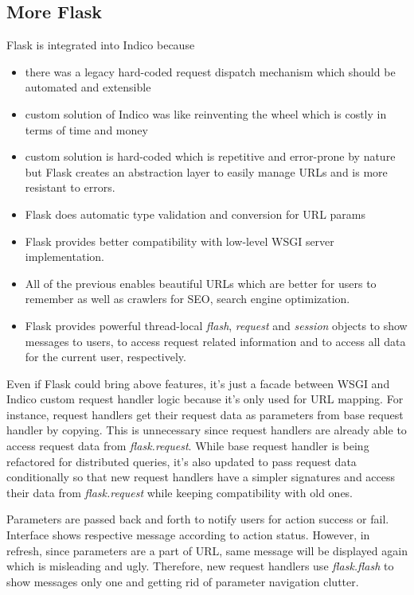 \subsection{More Flask}

Flask is integrated into Indico because
\begin{itemize}
  \item there was a legacy hard-coded request dispatch mechanism which should be automated and extensible
  \item custom solution of Indico was like reinventing the wheel which is costly in terms of time and money
  \item custom solution is hard-coded which is repetitive and error-prone by nature but Flask creates an abstraction layer to easily manage URLs and is more resistant to errors.
  \item Flask does automatic type validation and conversion for URL params
  \item Flask provides better compatibility with low-level WSGI server implementation.
  \item All of the previous enables beautiful URLs which are better for users to remember as well as crawlers for SEO, search engine optimization.
  \item Flask provides powerful thread-local \textit{flash}, \textit{request} and \textit{session} objects to show messages to users, to access request related information and to access all data for the current user, respectively. 
\end{itemize}

Even if Flask could bring above features, it's just a facade between WSGI and Indico custom request handler logic because it's only used for URL mapping. For instance, request handlers get their request data as parameters from base request handler by copying. This is unnecessary since request handlers are already able to access request data from \textit{flask.request}. While base request handler is being refactored for distributed queries, it's also updated to pass request data conditionally so that new request handlers have a simpler signatures and access their data from \textit{flask.request} while keeping compatibility with old ones.

Parameters are passed back and forth to notify users for action success or fail. Interface shows respective message according to action status. However, in refresh, since parameters are a part of URL, same message will be displayed again which is misleading and ugly. Therefore, new request handlers use \textit{flask.flash} to show messages only one and getting rid of parameter navigation clutter.

